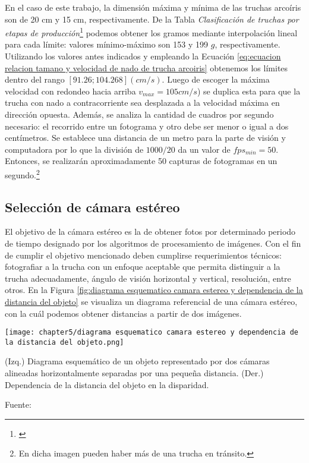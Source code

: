 En el caso de este trabajo, la dimensión máxima y mínima de las truchas arcoíris son de 20 cm y 15 cm, respectivamente. De la Tabla \textit{Clasificación de truchas por etapas de producción}\footnote{\cite{DiazVergara2020}} podemos obtener los gramos mediante interpolación lineal para cada límite: valores mínimo-máximo son 153 y 199 \textit{$g$}, respectivamente. Utilizando los valores antes indicados y empleando la Ecuación \ref{eq:ecuacion relacion tamano y velocidad de nado de trucha arcoiris} obtenemos los límites dentro del rango $[91.26; 104.268] (cm/s)$. Luego de escoger la máxima velocidad con redondeo hacia arriba $v_{max}=105cm/s$) se duplica esta para que la trucha con nado a contracorriente sea desplazada a la velocidad máxima en dirección opuesta. Además, se analiza la cantidad de cuadros por segundo necesario: el recorrido entre un fotograma y otro debe ser menor o igual a dos centímetros. Se establece una distancia de un metro para la parte de visión y computadora por lo que la división de $1000/20$ da un valor de $fps_{min}=50$. Entonces, se realizarán aproximadamente 50 capturas de fotogramas en un segundo.\footnote{En dicha imagen pueden haber más de una trucha en tránsito.}

\subsection{Selección de cámara estéreo}

El objetivo de la cámara estéreo es la de obtener fotos por determinado periodo de tiempo designado por los algoritmos de procesamiento de imágenes. Con el fin de cumplir el objetivo mencionado deben cumplirse requerimientos técnicos: fotografiar a la trucha con un enfoque aceptable que permita distinguir a la trucha adecuadamente, ángulo de visión horizontal y vertical, resolución, entre otros. En la Figura \ref{fig:diagrama esquematico camara estereo y dependencia de la distancia del objeto} se visualiza un diagrama referencial de una cámara estéreo, con la cuál podemos obtener distancias a partir de dos imágenes. 

\begin{myfigure}[H]
	\footnotesize\centering
	\texttt{[image: chapter5/diagrama esquematico camara estereo y dependencia de la distancia del objeto.png]}
	\caption[Diagrama esquemático y dependencia de la distancia del objeto seguido por una cámara estéreo.]{(Izq.) Diagrama esquemático de un objeto representado por dos cámaras alineadas horizontalmente separadas por una pequeña distancia. (Der.) Dependencia de la distancia del objeto en la disparidad.}
	\begin{myflushcenter}
		Fuente: \cite{Mahammed2013}
	\end{myflushcenter}
	\label{fig:diagrama esquematico camara estereo y dependencia de la distancia del objeto}
\end{myfigure}

